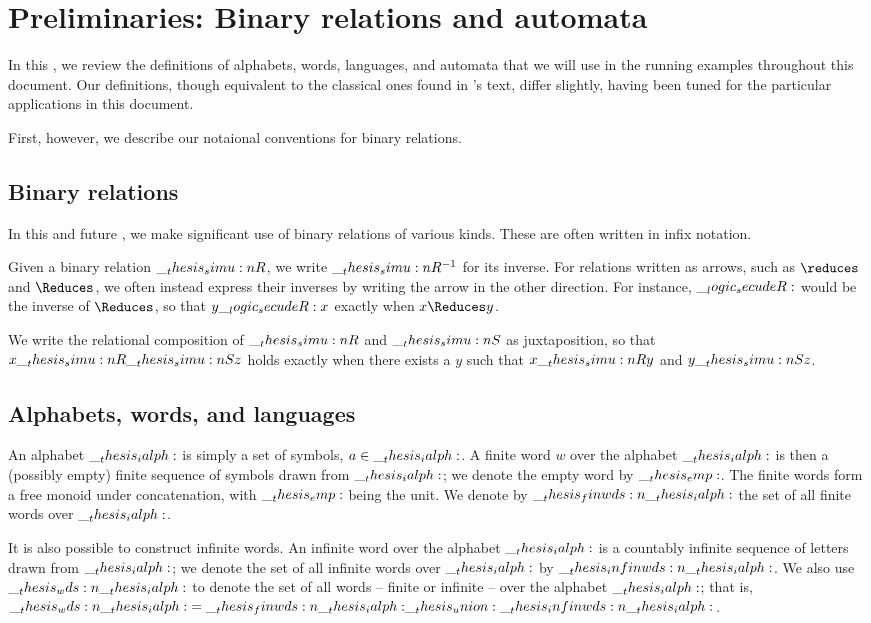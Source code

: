 \chapter{Preliminaries: Binary relations and automata}\label{ch:automata}\label{ch:finite-automata}

In this , we review the definitions of alphabets, words, languages, and automata that we will use in the running examples throughout this document.
Our definitions, though equivalent to the classical ones found in \textcite{Hopcroft+:06}'s text, differ slightly, having been tuned for the particular applications in this document.

First, however, we describe our notaional conventions for binary relations.

\section{Binary relations}

In this and future , we make significant use of binary relations of various kinds.
These are often written in infix notation.

Given a binary relation $\__thesis_simu:n {R}$, we write $\__thesis_simu:n {R}^{-1}$ for its inverse.
For relations written as arrows, such as $\reduces$ and $\Reduces$, we often instead express their inverses by writing the arrow in the other direction.
For instance, $\__logic_secudeR:$ would be the inverse of $\Reduces$, so that $y \__logic_secudeR: x$ exactly when $x \Reduces y$.

We write the relational composition of $\__thesis_simu:n {R}$ and $\__thesis_simu:n {S}$ as juxtaposition, so that $x \__thesis_simu:n {R}\__thesis_simu:n {S} z$ holds exactly when there exists a $y$ such that $x \__thesis_simu:n {R} y$ and $y \__thesis_simu:n {S} z$.

\section{Alphabets, words, and languages}

An alphabet $\__thesis_ialph:$ is simply a set of symbols, $a \in \__thesis_ialph:$.
A finite word $w$ over the alphabet $\__thesis_ialph:$ is then a (possibly empty) finite sequence of symbols drawn from $\__thesis_ialph:$;
we denote the empty word by $\__thesis_emp:$.
The finite words form a free monoid under concatenation, with $\__thesis_emp:$ being the unit.
We denote by $\__thesis_finwds:n {\__thesis_ialph:}$ the set of all finite words over $\__thesis_ialph:$.

It is also possible to construct infinite words.
An infinite word over the alphabet $\__thesis_ialph:$ is a countably infinite sequence of letters drawn from $\__thesis_ialph:$;
we denote the set of all infinite words over $\__thesis_ialph:$ by $\__thesis_infinwds:n {\__thesis_ialph:}$.
We also use $\__thesis_wds:n {\__thesis_ialph:}$ to denote the set of all words -- finite or infinite -- over the alphabet $\__thesis_ialph:$; that is, $\__thesis_wds:n {\__thesis_ialph:} = \__thesis_finwds:n {\__thesis_ialph:} \__thesis_union: \__thesis_infinwds:n {\__thesis_ialph:}$.

